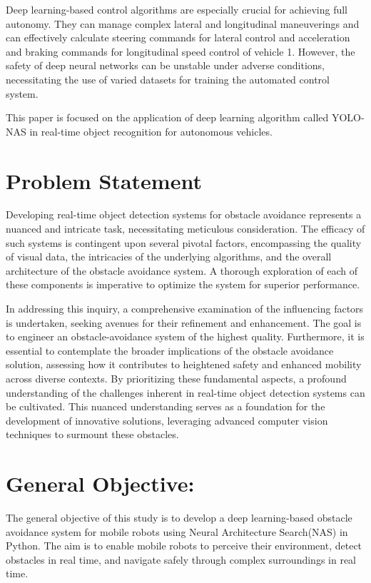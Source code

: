 Deep learning-based control algorithms are especially crucial for achieving full autonomy. They can manage complex lateral and longitudinal maneuverings and can effectively calculate steering commands for lateral control and acceleration and braking commands for longitudinal speed control of vehicle 1. However, the safety of deep neural networks can be unstable under adverse conditions, necessitating the use of varied datasets for training the automated control system.

This paper is focused on the application of deep learning algorithm called YOLO-NAS in real-time object recognition for autonomous vehicles. 







\section{Problem Statement}
Developing real-time object detection systems for obstacle avoidance represents a nuanced and intricate task, necessitating meticulous consideration. The efficacy of such systems is contingent upon several pivotal factors, encompassing the quality of visual data, the intricacies of the underlying algorithms, and the overall architecture of the obstacle avoidance system. A thorough exploration of each of these components is imperative to optimize the system for superior performance.

In addressing this inquiry, a comprehensive examination of the influencing factors is undertaken, seeking avenues for their refinement and enhancement. The goal is to engineer an obstacle-avoidance system of the highest quality. Furthermore, it is essential to contemplate the broader implications of the obstacle avoidance solution, assessing how it contributes to heightened safety and enhanced mobility across diverse contexts. By prioritizing these fundamental aspects, a profound understanding of the challenges inherent in real-time object detection systems can be cultivated. This nuanced understanding serves as a foundation for the development of innovative solutions, leveraging advanced computer vision techniques to surmount these obstacles.

\section{General Objective:}
The general objective of this study is to develop a deep learning-based obstacle avoidance system for mobile robots using Neural Architecture Search(NAS) in Python. The aim is to enable mobile robots to perceive their environment, detect obstacles in real time, and navigate safely through complex surroundings in real time.
